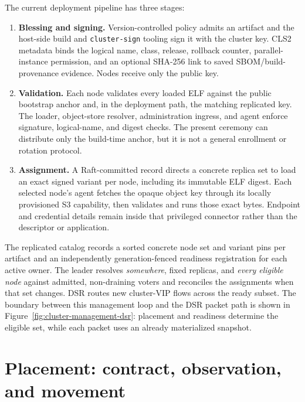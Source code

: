 The current deployment pipeline has three stages:

\begin{enumerate}
    \item \textbf{Blessing and signing.} Version-controlled policy admits an
        artifact and the host-side build and \texttt{cluster-}\allowbreak\texttt{sign} tooling
        sign it with the cluster key. CLS2 metadata binds the logical name,
        class, release, rollback counter, parallel-instance permission, and
        an optional SHA-256 link to saved SBOM/build-provenance evidence.
        Nodes receive only the public key.

    \item \textbf{Validation.} Each node validates every loaded ELF against
        the public bootstrap anchor and, in the deployment path, the matching
        replicated key. The loader, object-store resolver, administration
        ingress, and agent enforce signature, logical-name, and digest checks.
        The present ceremony can distribute only the build-time anchor, but it is
        not a general enrollment or rotation protocol.

    \item \textbf{Assignment.} A Raft-committed record directs a concrete
        replica set to load an exact signed variant per node, including its immutable ELF digest.
        Each selected node's agent fetches the opaque object key through its
        locally provisioned S3 capability, then validates and runs those exact
        bytes. Endpoint and credential details remain inside that privileged
        connector rather than the descriptor or application.
\end{enumerate}

The replicated catalog records a sorted concrete node set and variant pins per artifact and an
independently generation-fenced readiness registration for each active owner.
The leader resolves \emph{somewhere}, fixed replicas, and
\emph{every eligible node} against admitted, non-draining voters and
reconciles the assignments when that set changes. DSR routes new cluster-VIP
flows across the ready subset. The boundary between this management loop and
the DSR packet path is shown in
Figure~\ref{fig:cluster-management-dsr}: placement and readiness determine the
eligible set, while each packet uses an already materialized snapshot.

\section{Placement: contract, observation, and movement}

